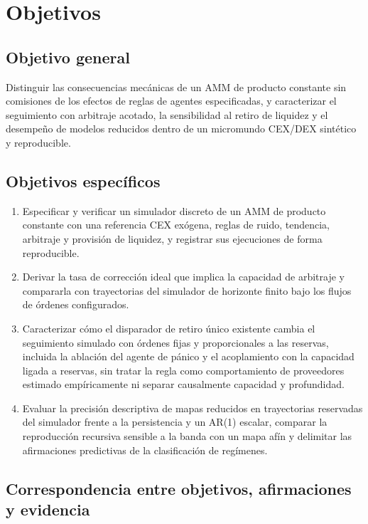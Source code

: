 \chapter{Objetivos}
\label{cap:objetivos}

\section{Objetivo general}

Distinguir las consecuencias mecánicas de un AMM de producto constante sin comisiones de los efectos de reglas de agentes especificadas, y caracterizar el seguimiento con arbitraje acotado, la sensibilidad al retiro de liquidez y el desempeño de modelos reducidos dentro de un micromundo CEX/DEX sintético y reproducible.

\section{Objetivos específicos}

\begin{enumerate}[label=\textbf{OE\arabic*.}, leftmargin=3em]
  \item Especificar y verificar un simulador discreto de un AMM de producto constante con una referencia CEX exógena, reglas de ruido, tendencia, arbitraje y provisión de liquidez, y registrar sus ejecuciones de forma reproducible.
  \item Derivar la tasa de corrección ideal que implica la capacidad de arbitraje y compararla con trayectorias del simulador de horizonte finito bajo los flujos de órdenes configurados.
  \item Caracterizar cómo el disparador de retiro único existente cambia el seguimiento simulado con órdenes fijas y proporcionales a las reservas, incluida la ablación del agente de pánico y el acoplamiento con la capacidad ligada a reservas, sin tratar la regla como comportamiento de proveedores estimado empíricamente ni separar causalmente capacidad y profundidad.
  \item Evaluar la precisión descriptiva de mapas reducidos en trayectorias reservadas del simulador frente a la persistencia y un AR(1) escalar, comparar la reproducción recursiva sensible a la banda con un mapa afín y delimitar las afirmaciones predictivas de la clasificación de regímenes.
\end{enumerate}

\section{Correspondencia entre objetivos, afirmaciones y evidencia}

